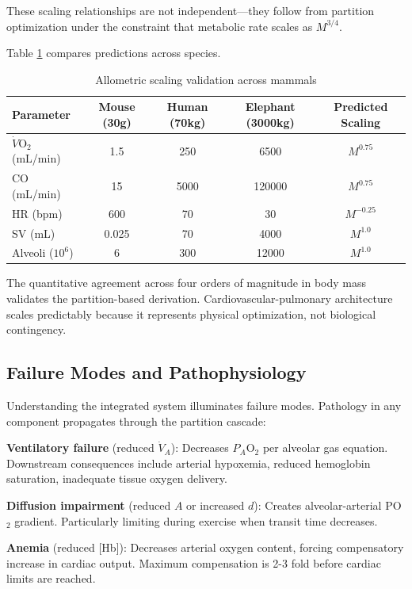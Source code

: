\documentclass[10pt,twocolumn,a4paper]{article}
\theoremstyle{remark}
\begin{document}
These scaling relationships are not independent—they follow from partition optimization under the constraint that metabolic rate scales as $M^{3/4}$.

Table \ref{tab:allometric_validation} compares predictions across species.

\begin{table}[h]
\centering
\caption{Allometric scaling validation across mammals}
\label{tab:allometric_validation}
\begin{tabular}{lcccc}
\toprule
\textbf{Parameter} & \textbf{Mouse (30g)} & \textbf{Human (70kg)} & \textbf{Elephant (3000kg)} & \textbf{Predicted Scaling} \\
\midrule
$\dot{V}\mathrm{O}_{2}$ (mL/min) & 1.5 & 250 & 6500 & $M^{0.75}$ \\
CO (mL/min) & 15 & 5000 & 120000 & $M^{0.75}$ \\
HR (bpm) & 600 & 70 & 30 & $M^{-0.25}$ \\
SV (mL) & 0.025 & 70 & 4000 & $M^{1.0}$ \\
Alveoli ($10^{6}$) & 6 & 300 & 12000 & $M^{1.0}$ \\
\bottomrule
\end{tabular}
\end{table}

The quantitative agreement across four orders of magnitude in body mass validates the partition-based derivation. Cardiovascular-pulmonary architecture scales predictably because it represents physical optimization, not biological contingency.

\subsection{Failure Modes and Pathophysiology}

Understanding the integrated system illuminates failure modes. Pathology in any component propagates through the partition cascade:

\textbf{Ventilatory failure} (reduced $\dot{V}_{A}$): Decreases $P_{A}\mathrm{O}_{2}$ per alveolar gas equation. Downstream consequences include arterial hypoxemia, reduced hemoglobin saturation, inadequate tissue oxygen delivery.

\textbf{Diffusion impairment} (reduced $A$ or increased $d$): Creates alveolar-arterial PO$_{2}$ gradient. Particularly limiting during exercise when transit time decreases.

\textbf{Anemia} (reduced [Hb]): Decreases arterial oxygen content, forcing compensatory increase in cardiac output. Maximum compensation is 2-3 fold before cardiac limits are reached.
\end{document}
